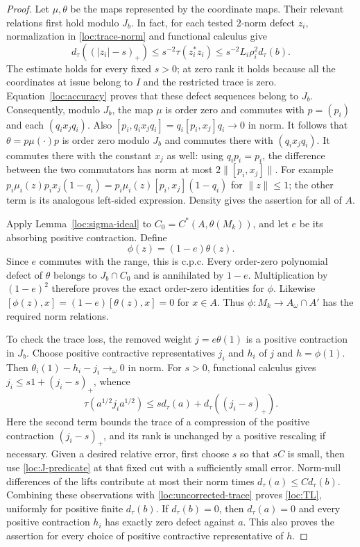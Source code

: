 \begin{proof}
Let $\mu,\theta$ be the \cpc maps represented by the coordinate
maps.  Their relevant relations first hold modulo $J_b$.  In fact,
for each tested $2$-norm defect $z_i$, normalization in
\eqref{loc:trace-norm} and functional calculus give
\[
 d_\tau((|z_i|-s)_+)
   \le s^{-2}\tau(z_i^*z_i)
   \le s^{-2}L_i\rho_i^2d_\tau(b).
\]
The estimate holds for every fixed $s>0$; at zero rank it holds because
all the coordinates at issue belong to $I$ and the restricted trace
is zero.  Equation~\eqref{loc:accuracy} proves that these defect
sequences belong to $J_b$.  Consequently, modulo $J_b$, the map
$\mu$ is order zero and commutes with $p=(p_i)$ and each
$(q_i x_jq_i)$.  Also
$[p_i,q_ix_jq_i]=q_i[p_i,x_j]q_i\to0$ in norm.  It follows that
$\theta=p\mu(\cdot)p$ is order zero modulo $J_b$ and commutes there
with $(q_ix_jq_i)$.  It commutes there with the constant $x_j$ as
well: using $q_ip_i=p_i$, the difference between the two commutators
has norm at most $2\|[p_i,x_j]\|$.  For example
$p_i\mu_i(z)p_i x_j(1-q_i)
=p_i\mu_i(z)[p_i,x_j](1-q_i)$ for $\|z\|\le1$; the other term is
its analogous left-sided expression.  Density gives the assertion
for all of $A$.

Apply Lemma~\ref{loc:sigma-ideal} to
$C_0=C^*(A,\theta(M_k))$, and let $e$ be its absorbing positive
contraction.  Define
\[
 \phi(z)=(1-e)\theta(z).
\]
Since $e$ commutes with the range, this is c.p.c.  Every order-zero
polynomial defect of $\theta$ belongs to $J_b\cap C_0$ and is
annihilated by $1-e$.  Multiplication by $(1-e)^2$ therefore proves
the exact order-zero identities for $\phi$.  Likewise
$[\phi(z),x]=(1-e)[\theta(z),x]=0$ for $x\in A$.  Thus
$\phi:M_k\to A_\omega\cap A'$ has the required norm relations.

To check the trace loss, the removed weight
$j=e\theta(1)$ is a positive contraction in $J_b$.  Choose positive
contractive representatives $j_i$ and $h_i$ of $j$ and $h=\phi(1)$.
Then $\theta_i(1)-h_i-j_i\to_\omega0$ in norm.  For $s>0$,
functional calculus gives $j_i\le s1+(j_i-s)_+$, whence
\begin{equation}\label{loc:correction-cost}
 \tau(a^{1/2}j_i a^{1/2})
 \le s d_\tau(a)+d_\tau((j_i-s)_+).
\end{equation}
Here the second term bounds the trace of a compression of the
positive contraction $(j_i-s)_+$, and its rank is unchanged by a
positive rescaling if necessary.  Given a desired relative error,
first choose $s$ so that $sC$ is small, then use
\eqref{loc:J-predicate} at that fixed cut with a sufficiently small
error.  Norm-null differences of the lifts contribute at most their
norm times $d_\tau(a)\le C d_\tau(b)$.  Combining these observations
with \eqref{loc:uncorrected-trace} proves \eqref{loc:TL}, uniformly
for positive finite $d_\tau(b)$.  If $d_\tau(b)=0$, then
$d_\tau(a)=0$ and every positive contraction $h_i$ has exactly zero
defect against $a$.  This also proves the assertion for every choice
of positive contractive representative of $h$.


\end{proof}
